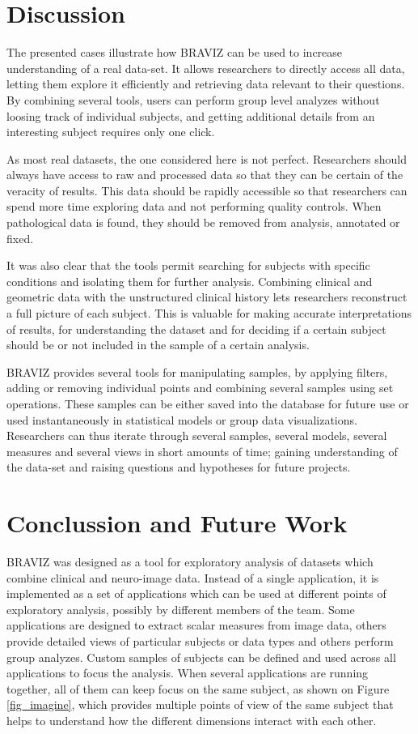 \documentclass[twocolumn]{svjour3}
\begin{document}
\section{Discussion}
\label{sec:disc}

The presented cases illustrate how BRAVIZ can be used to increase understanding of a real data-set. 
It allows researchers to directly access all data, letting them explore it efficiently and retrieving data relevant to their questions. By combining several tools, users can perform group level analyzes without loosing track of individual subjects, and getting additional details from an interesting subject requires only one click. 

As most real datasets, the one considered here is not perfect. Researchers should always have access to raw and processed data so that they can be certain of the veracity of results. This data should be rapidly accessible so that researchers can spend more time exploring data and not performing quality controls. When pathological data is found, they should be removed from analysis, annotated or fixed. 

It was also clear that the tools permit searching for subjects with specific conditions and isolating them for further analysis. Combining clinical and geometric data with the unstructured clinical history lets researchers reconstruct a full picture of each subject. This is valuable for making accurate interpretations of results, for understanding the dataset and for deciding if a certain subject should be or not included in the sample of a certain analysis. 

BRAVIZ provides several tools for manipulating samples, by applying filters, adding or removing individual points and combining several samples using set operations. These samples can be either saved into the database for future use or used instantaneously in statistical models or group data visualizations. Researchers can thus iterate through several samples, several models, several measures and several views in short amounts of time; gaining understanding of the data-set and raising questions and hypotheses for future projects.

\section{Conclussion and Future Work}

BRAVIZ was designed as a tool for exploratory analysis of datasets which combine clinical and neuro-image data. Instead of a single application, it is implemented as a set of applications which can be used at different points of exploratory analysis, possibly by different members of the team. Some applications are designed to extract scalar measures from image data, others provide detailed views of particular subjects or data types and others perform group analyzes. Custom samples of subjects can be defined and used across all applications to focus the analysis. When several applications are running together, all of them can keep focus on the same subject, as shown on Figure \ref{fig_imagine}, which provides multiple points of view of the same subject that helps to understand how the different dimensions interact with each other. 
\end{document}
